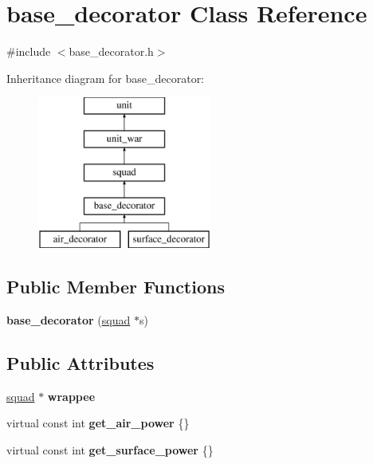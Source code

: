 \hypertarget{classbase__decorator}{}\section{base\+\_\+decorator Class Reference}
\label{classbase__decorator}


{\ttfamily \#include $<$base\+\_\+decorator.\+h$>$}

Inheritance diagram for base\+\_\+decorator\+:\begin{figure}[H]
\begin{center}
\leavevmode
\includegraphics[height=5.000000cm]{classbase__decorator}
\end{center}
\end{figure}
\subsection*{Public Member Functions}
\begin{DoxyCompactItemize}
\item 
\mbox{\label{classbase__decorator_a51fc20858a082f22366cd25ad092a630}} 
{\bfseries base\+\_\+decorator} (\mbox{\hyperlink{classsquad}{squad}} $\ast$s)
\end{DoxyCompactItemize}
\subsection*{Public Attributes}
\begin{DoxyCompactItemize}
\item 
\mbox{\label{classbase__decorator_ac7c794ff0e6cb61f2662cc9d691cf237}} 
\mbox{\hyperlink{classsquad}{squad}} $\ast$ {\bfseries wrappee}
\item 
\mbox{\label{classbase__decorator_aa91695be3a0986b5937d1ae7ee0b51ad}} 
virtual const int {\bfseries get\+\_\+air\+\_\+power} \{\}
\item 
\mbox{\label{classbase__decorator_ad8661d7a99fcb263c85d563e376adf47}} 
virtual const int {\bfseries get\+\_\+surface\+\_\+power} \{\}
\end{DoxyCompactItemize}
